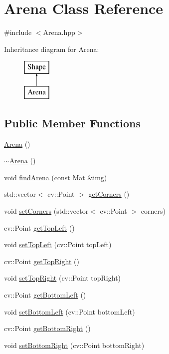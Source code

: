 \hypertarget{class_arena}{}\section{Arena Class Reference}
\label{class_arena}


{\ttfamily \#include $<$Arena.\+hpp$>$}

Inheritance diagram for Arena\+:\begin{figure}[H]
\begin{center}
\leavevmode
\includegraphics[height=2.000000cm]{class_arena}
\end{center}
\end{figure}
\subsection*{Public Member Functions}
\begin{DoxyCompactItemize}
\item 
\mbox{\hyperlink{class_arena_a74f105bc709d4728fb07f1984abfd345}{Arena}} ()
\item 
\mbox{\hyperlink{class_arena_ae21b399e9e3f6b8ac4ecc44d7d1667fc}{$\sim$\+Arena}} ()
\item 
void \mbox{\hyperlink{class_arena_aa37acdf43108ab0da04b77bbf79c2f7d}{find\+Arena}} (const Mat \&img)
\item 
std\+::vector$<$ cv\+::\+Point $>$ \mbox{\hyperlink{class_arena_a67171d93c7aff0f9d8bd3ee0596e9033}{get\+Corners}} ()
\item 
void \mbox{\hyperlink{class_arena_a7f822f33ff5810d4d266183e7606c0fe}{set\+Corners}} (std\+::vector$<$ cv\+::\+Point $>$ corners)
\item 
cv\+::\+Point \mbox{\hyperlink{class_arena_ae7219e6d298213627a0c671e5c5f9536}{get\+Top\+Left}} ()
\item 
void \mbox{\hyperlink{class_arena_a7ab570cb7821df75c6da9af6491be034}{set\+Top\+Left}} (cv\+::\+Point top\+Left)
\item 
cv\+::\+Point \mbox{\hyperlink{class_arena_aa417bc8757d66038038ac3f6a9d44860}{get\+Top\+Right}} ()
\item 
void \mbox{\hyperlink{class_arena_a82c7fa04e8acf52f6edecc1ee1c38001}{set\+Top\+Right}} (cv\+::\+Point top\+Right)
\item 
cv\+::\+Point \mbox{\hyperlink{class_arena_afdd88e341c385561eafbc73e90e08404}{get\+Bottom\+Left}} ()
\item 
void \mbox{\hyperlink{class_arena_ac546db1983967fcc195369c8a0f1f9e5}{set\+Bottom\+Left}} (cv\+::\+Point bottom\+Left)
\item 
cv\+::\+Point \mbox{\hyperlink{class_arena_ac62870a7bfa41baa7d38c4f7373cf3f5}{get\+Bottom\+Right}} ()
\item 
void \mbox{\hyperlink{class_arena_a2207ae5feab0d9ef8a19ab46fdd8685c}{set\+Bottom\+Right}} (cv\+::\+Point bottom\+Right)
\end{DoxyCompactItemize}


